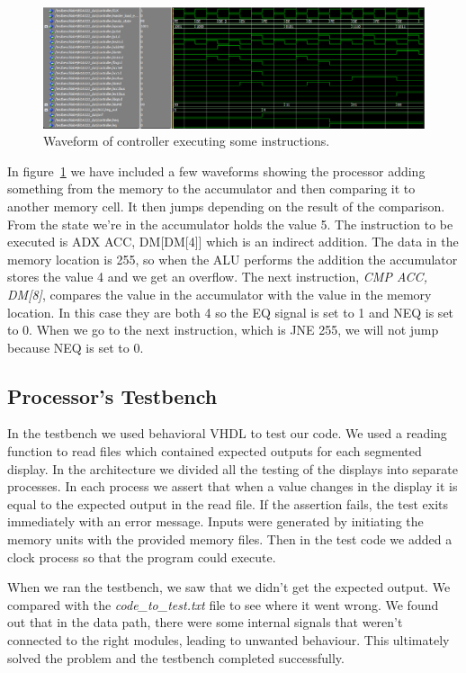 \documentclass[a4,11pt]{article}
\begin{document}
\begin{figure}[h!]
	\centering
	\includegraphics[width=1\textwidth]{Figurer/controller}
	\caption{Waveform of controller executing some instructions.}
	\label{fig:con}
\end{figure}
\newpage
In figure~\ref{fig:con} we have included a few waveforms showing the processor adding something 
from the memory to the accumulator and then comparing it to another memory cell. It then jumps 
depending on the result of the comparison. From the state we're in the accumulator holds the value 5. 
The instruction to be executed is ADX ACC, DM[DM[4]] which is an indirect addition. The data in the 
memory location is 255, so when the ALU performs the addition the accumulator stores the value 4 and 
we get an overflow. The next instruction, \emph{CMP ACC, DM[8]}, compares the value in the accumulator 
with the value in the memory location. In this case they are both 4 so the EQ signal is set to 1 and 
NEQ is set to 0. When we go to the next instruction, which is JNE 255, we will not jump because NEQ is 
set to 0.

\subsection{Processor's Testbench}

In the testbench we used behavioral VHDL to test our code. We used a reading function to read files which
contained expected outputs for each segmented display. In the architecture we divided all the testing 
of the displays into separate processes. In each process we assert that when a value changes in the display
it is equal to the expected output in the read file. If the assertion fails, the test exits immediately 
with an error message. Inputs were generated by initiating the memory units with the provided memory files.
Then in the test code we added a clock process so that the program could execute.

When we ran the testbench, we saw that we didn't get the expected output. We compared with the
{\it code\_to\_test.txt} file to see where it went wrong. We found out that in the data path,
there were some internal signals that weren't connected to the right modules, leading to unwanted
behaviour. This ultimately solved the problem and the testbench completed successfully.
\end{document}
